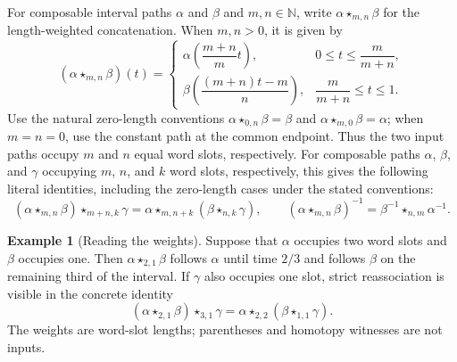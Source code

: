 \documentclass[10pt,reqno]{amsart}
\theoremstyle{definition}
\newtheorem{example}[definition]{Example}
\theoremstyle{plain}
\theoremstyle{remark}
\newcommand{\N}{\mathbb N}
\newcommand{\FigureAltText}[1]{\par\smallskip{\small\textbf{Alt text:} #1\par}}
\newcommand{\MainFigure}[2]{%
  \begingroup\let\SavedFigureCaption\caption
  \renewcommand{\caption}[1]{\SavedFigureCaption{##1}\FigureAltText{#2}}%
  \endgroup}
\begin{document}
\enlargethispage{16pt}
\begingroup\captionindent=0pt
\setlength{\intextsep}{6pt}
\MainFigure{oriented-steps}{Labelled steps from a through b to c compose to p=r;s. A parallel witness u is connected to p only when the scoped rules derive their equality, which implies endpoint-fixed homotopy of their realizations. Formal reversal exchanges endpoints and reverses time.}
\endgroup


For composable interval paths $\alpha$ and $\beta$ and $m,n\in\N$, write
$\alpha\star_{m,n}\beta$ for the length-weighted concatenation.  When
$m,n>0$, it is given by
\[
 (\alpha\star_{m,n}\beta)(t)=
 \begin{cases}
   \alpha\!\left(\dfrac{m+n}{m}t\right),
     &0\leq t\leq\dfrac{m}{m+n},\\[7pt]
   \beta\!\left(\dfrac{(m+n)t-m}{n}\right),
     &\dfrac{m}{m+n}\leq t\leq 1.
 \end{cases}
\]
Use the natural zero-length conventions
$\alpha\star_{0,n}\beta=\beta$ and
$\alpha\star_{m,0}\beta=\alpha$; when $m=n=0$, use the constant path at
the common endpoint.  Thus the two input paths occupy $m$ and $n$ equal
word slots, respectively.  For composable paths $\alpha$, $\beta$, and
$\gamma$ occupying $m$, $n$, and $k$ word slots, respectively, this gives the
following literal identities, including the zero-length cases under the stated
conventions:
\[
 (\alpha\star_{m,n}\beta)\star_{m+n,k}\gamma
 =\alpha\star_{m,n+k}(\beta\star_{n,k}\gamma),
 \qquad
 (\alpha\star_{m,n}\beta)^{-1}
 =\beta^{-1}\star_{n,m}\alpha^{-1}.
\]

\begin{example}[Reading the weights]
Suppose that $\alpha$ occupies two word slots and $\beta$ occupies one.
Then $\alpha\star_{2,1}\beta$ follows $\alpha$ until time $2/3$ and
follows $\beta$ on the remaining third of the interval.  If $\gamma$ also
occupies one slot, strict reassociation is visible in the concrete identity
\[
  (\alpha\star_{2,1}\beta)\star_{3,1}\gamma
  =\alpha\star_{2,2}(\beta\star_{1,1}\gamma).
\]
The weights are word-slot lengths; parentheses and homotopy witnesses are
not inputs.
\end{example}
\end{document}
